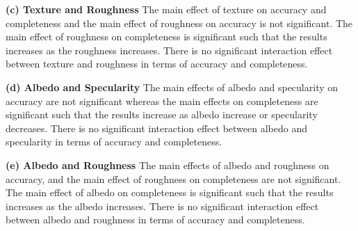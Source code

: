 \textbf{(c) Texture and Roughness} 
The main effect of texture on accuracy and completeness and the main effect of roughness on accuracy is not significant. The main effect of roughness on completeness is significant such that the results increases as the roughness increases. There is no significant interaction effect between texture and roughness in terms of accuracy and completeness.

\textbf{(d) Albedo and Specularity} 
The main effects of albedo and specularity on accuracy are not significant whereas the main effects on completeness are significant such that the results increase as albedo increase or specularity decreases. There is no significant interaction effect between albedo and specularity in terms of accuracy and completeness.


\textbf{(e) Albedo and Roughness} 
The main effects of albedo and roughness on accuracy, and the main effect of roughness on completeness are not significant. The main effect of albedo on completeness is significant such that the results increases as the albedo increases. There is no significant interaction effect between albedo and roughness in terms of accuracy and completeness.

